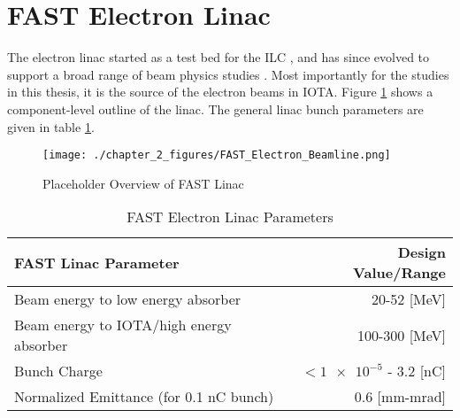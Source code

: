 \section{FAST Electron Linac}
The electron linac started as a test bed for the ILC \cite{churchPlans750MeV2007,broemmelsiekRecordHighgradientSRF2018}, and has since evolved to support a broad range of beam physics studies \cite{croppFASTLowEnergyBeamline2023,kladovNearInfraredNoiseIntense2025}. Most importantly for the studies in this thesis, it is the source of the electron beams in IOTA. Figure \ref{fig:linacOutline} shows a component-level outline of the linac. The general linac bunch parameters are given in table \ref{tab:linac}. 

\begin{figure}
	\centering
	\texttt{[image: ./chapter\_2\_figures/FAST\_Electron\_Beamline.png]}
	\caption{Placeholder Overview of FAST Linac}
	\label{fig:linacOutline}
\end{figure}

\begin{table}
    \centering
    \begin{tabular}{lr}
    \toprule
    \textbf{FAST Linac Parameter} & \textbf{Design Value/Range}\\
    \midrule
    Beam energy to low energy absorber & 20-52 [MeV]\\
    Beam energy to IOTA/high energy absorber & 100-300 [MeV]\\
    Bunch Charge & $<\num{1e-5}$ - 3.2 [nC]\\
    Normalized Emittance (for 0.1 nC bunch) & 0.6 [mm-mrad]\\
    \bottomrule
    \end{tabular}
    \caption{FAST Electron Linac Parameters}
    \label{tab:linac}
\end{table}


